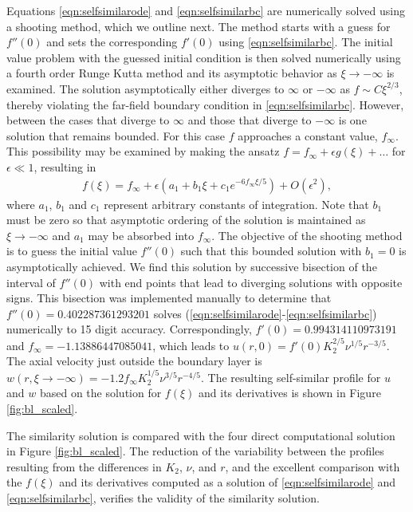 \documentclass[]{jfm}
\begin{document}
Equations \eqref{eqn:selfsimilarode} and \eqref{eqn:selfsimilarbc} are numerically solved using a shooting method, which we outline next. 
The method starts with a guess for $f''(0)$ and sets the corresponding $f'(0)$ using \eqref{eqn:selfsimilarbc}.
The initial value problem with the guessed initial condition is then solved numerically using a fourth order Runge Kutta method and its asymptotic behavior as $\xi \to -\infty$ is examined. The solution asymptotically either diverges to $\infty$ or $-\infty$ as $f\sim C \xi^{2/3}$, thereby violating the far-field boundary condition in \eqref{eqn:selfsimilarbc}. 
However, between the cases that diverge to $\infty$ and those that diverge to $-\infty$ is one solution that remains bounded.
For this case $f$ approaches a constant value, $f_\infty$.
This possibility may be examined by making the ansatz $f = f_\infty + \epsilon g(\xi) + \dots$ for $\epsilon \ll 1$, resulting in
\begin{align}
 f(\xi) = f_\infty + \epsilon \left( a_1 + b_1 \xi + c_1 e^{-6f_\infty \xi/5}  \right) + O(\epsilon^2),
\end{align}
where $a_1$, $b_1$ and $c_1$ represent arbitrary constants of integration.
Note that $b_1$ must be zero so that asymptotic ordering of the solution is maintained as $\xi \to -\infty$ and $a_1$ may be absorbed into $f_\infty$.
The objective of the shooting method is to guess the initial value $f''(0)$ such that this bounded solution with $b_1=0$ is asymptotically achieved.
We find this solution by successive bisection of the interval of $f''(0)$ with end points that lead to diverging solutions with opposite signs.
This bisection was implemented manually to determine that $f''(0) = 0.402287361293201$ solves (\ref{eqn:selfsimilarode}-\ref{eqn:selfsimilarbc}) numerically to 15 digit accuracy.
Correspondingly, $f'(0) = 0.994314110973191$ and $f_\infty = -1.13886447085041$, which leads to $u(r,0) = f'(0) K_2^{2/5} \nu^{1/5} r^{-3/5}$.
The axial velocity just outside the boundary layer is $w(r, \xi\to -\infty) = -1.2f_\infty K_2^{1/5} \nu^{3/5}r^{-4/5}$.
The resulting self-similar profile for $u$ and $w$ based on the solution for $f(\xi)$ and its derivatives is shown in Figure \ref{fig:bl_scaled}.

The similarity solution is compared with the four direct computational solution in Figure \ref{fig:bl_scaled}.
The reduction of the variability between the profiles resulting from the differences in $K_2$, $\nu$, and $r$, and the excellent comparison with the $f(\xi)$ and its derivatives computed as a solution of \eqref{eqn:selfsimilarode} and \eqref{eqn:selfsimilarbc}, verifies the validity of the similarity solution.
\end{document}
